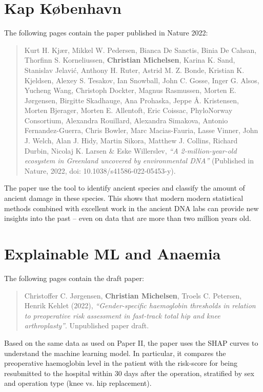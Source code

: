 
\chapter{Kap København}
\label{appendix:kapk}

The following  pages contain the paper published in Nature 2022:

\begin{quote}
    Kurt H. Kjær, Mikkel W. Pedersen, Bianca De Sanctis, Binia De Cahsan, Thorfinn S. Korneliussen, \textbf{Christian Michelsen}, Karina K. Sand, Stanislav Jelavić, Anthony H. Ruter, Astrid M. Z. Bonde, Kristian K. Kjeldsen, Alexey S. Tesakov, Ian Snowball, John C. Gosse, Inger G. Alsos, Yucheng Wang, Christoph Dockter, Magnus Rasmussen, Morten E. Jørgensen, Birgitte Skadhauge, Ana Prohaska, Jeppe Å. Kristensen, Morten Bjerager, Morten E. Allentoft, Eric Coissac, PhyloNorway Consortium, Alexandra Rouillard, Alexandra Simakova, Antonio Fernandez-Guerra, Chris Bowler, Marc Macias-Fauria, Lasse Vinner, John J. Welch, Alan J. Hidy, Martin Sikora, Matthew J. Collins, Richard Durbin, Nicolaj K. Larsen \& Eske Willerslev, \emph{``A 2-million-year-old ecosystem in Greenland uncovered by environmental DNA''} (Published in Nature, 2022, doi: 10.1038/s41586-022-05453-y).
\end{quote}
The paper use the \metaDMG tool to identify ancient species and classify the amount of ancient damage in these species.  This shows that modern modern statistical methods combined with excellent work in the ancient DNA labs can provide new insights into the past -- even on data that are more than two million years old.

\clearpage




\chapter{Explainable ML and Anaemia}
\label{appendix:anaemia}

The following  pages contain the draft paper:

\begin{quote}
    Christoffer C. Jørgensen, \textbf{Christian Michelsen}, Troels C. Petersen, Henrik Kehlet (2022), \emph{``Gender-specific haemoglobin thresholds in relation to preoperative risk assessment in fast-track total hip and knee arthroplasty''}. Unpublished paper draft.
\end{quote}
Based on the same data as used on Paper II, the paper uses the SHAP curves to understand the machine learning model. In particular, it compares the preoperative haemoglobin level in the patient with the risk-score for being resubmitted to the hospital within 30 days after the operation, stratified by sex and operation type (knee vs. hip replacement).
\clearpage



